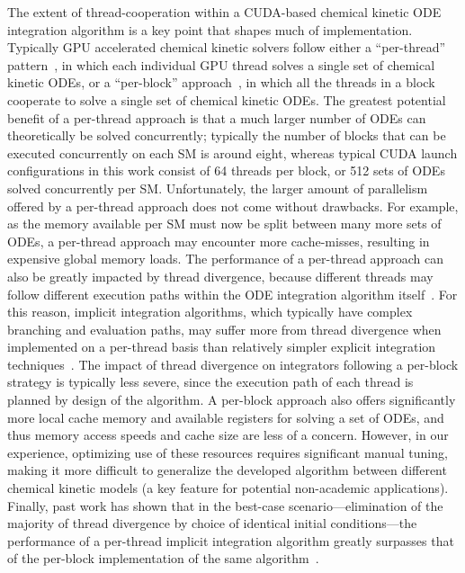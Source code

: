 \documentclass[preprint]{elsarticle}
\begin{document}
The extent of thread-cooperation within a CUDA-based chemical kinetic ODE integration algorithm is a key point that shapes much of implementation.
Typically GPU accelerated chemical kinetic solvers follow either a ``per-thread'' pattern~\cite{Niemeyer:2011aa,Stone:2013aa,Niemeyer:2014aa}, in which each individual GPU thread solves a single set of chemical kinetic ODEs, or a ``per-block'' approach~\cite{Stone:2013aa,Sewerin20151375}, in which all the threads in a block cooperate to solve a single set of chemical kinetic ODEs.
The greatest potential benefit of a per-thread approach is that a much larger number of ODEs can theoretically be solved concurrently; typically the number of blocks that can be executed concurrently on each SM is around eight, whereas typical CUDA launch configurations in this work consist of 64 threads per block, or 512 sets of ODEs solved concurrently per SM.
Unfortunately, the larger amount of parallelism offered by a per-thread approach does not come without drawbacks.
For example, as the memory available per SM must now be split between many more sets of ODEs, a per-thread approach may encounter more cache-misses, resulting in expensive global memory loads.
The performance of a per-thread approach can also be greatly impacted by thread divergence, because different threads may follow different execution paths within the ODE integration algorithm itself~\cite{Stone:2013aa,Niemeyer:2014aa}.
For this reason, implicit integration algorithms, which typically have complex branching and evaluation paths, may suffer more from thread divergence when implemented on a per-thread basis than relatively simpler explicit integration techniques~\cite{Stone:2013aa}.
The impact of thread divergence on integrators following a per-block strategy is typically less severe, since the execution path of each thread is planned by design of the algorithm.
A per-block approach also offers significantly more local cache memory and available registers for solving a set of ODEs, and thus memory access speeds and cache size are less of a concern.
However, in our experience, optimizing use of these resources requires significant manual tuning, making it more difficult to generalize the developed algorithm between different chemical kinetic models (a key feature for potential non-academic applications).
Finally, past work has shown that in the best-case scenario---elimination of the majority of thread divergence by choice of identical initial conditions---the performance of a per-thread implicit integration algorithm greatly surpasses that of the per-block implementation of the same algorithm~\cite{Stone:2013aa}.
\end{document}
